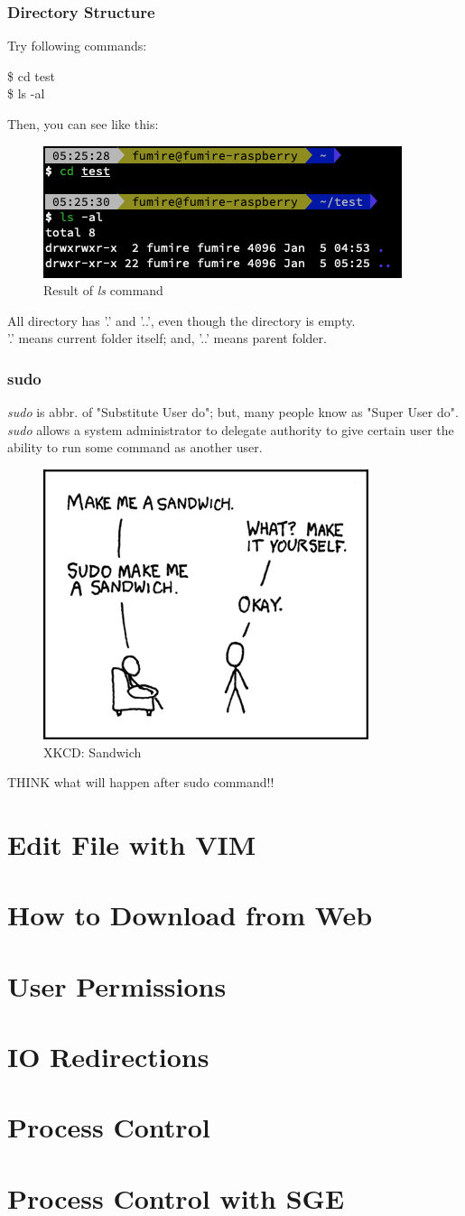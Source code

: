 \documentclass{beamer}
\begin{document}
	\begin{frame}
		\frametitle{Directory Structure}
		Try following commands:
		\begin{example}
			\$ cd test\\
			\$ ls -al
		\end{example}
		Then, you can see like this:
		\begin{figure}[h!]
			\centering
			\includegraphics[width=0.3 \linewidth]{figures/7.png}
			\caption{Result of \textit{ls} command}
		\end{figure}
		All directory has '.' and '..', even though the directory is empty. \\
		'.' means current folder itself; and, '..' means parent folder.
	\end{frame}

	\begin{frame}
		\frametitle{sudo}
		\textit{sudo} is abbr. of "Substitute User do"; but, many people know as "Super User do". \\

		\textit{sudo} allows a system administrator to delegate authority to give certain user the ability to run some command as another user.
		
		\begin{figure}[h!]
			\centering
			\includegraphics[width=0.3 \linewidth]{figures/sudo.png}
			\caption{XKCD: Sandwich}
		\end{figure}
	
		THINK what will happen after sudo command!!
		
	\end{frame}

	\section{Edit File with VIM}
	
	\section{How to Download from Web}
	
	\section{User Permissions}
	
	\section{IO Redirections}
	
	\section{Process Control}
	
	\section{Process Control with SGE}
\end{document}
